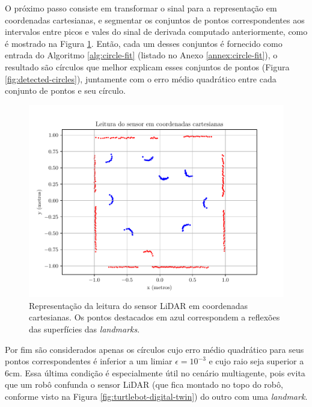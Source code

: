 O próximo passo consiste em transformar o sinal para a representação em 
coordenadas cartesianas, e segmentar os conjuntos de pontos correspondentes aos intervalos entre picos e vales do sinal de derivada computado anteriormente, como é mostrado na Figura \ref{fig:sensor-data-cartesian}.
Então, cada um desses conjuntos é fornecido como entrada do Algoritmo 
\ref{alg:circle-fit} (listado no Anexo \ref{annex:circle-fit}), o resultado 
são círculos que melhor explicam esses conjuntos de pontos (Figura \ref{fig:detected-circles}), juntamente com o 
erro médio quadrático entre cada conjunto de pontos e seu círculo.
\begin{figure}[]
  \centering
  \includegraphics[width=.8\textwidth]{figs/sensor_data_cartesian.pdf}
  \caption{Representação da leitura do sensor LiDAR em coordenadas 
  cartesianas. Os pontos destacados em azul correspondem a reflexões 
  das superfícies das \textit{landmarks}.}
  \label{fig:sensor-data-cartesian}
\end{figure}

Por fim são considerados apenas os círculos cujo erro médio quadrático para 
seus pontos correspondentes é inferior a um limiar $\epsilon = 10^{-3}$ e 
cujo raio seja superior a 6cm. Essa última condição é especialmente útil no 
cenário multiagente, pois evita que um robô confunda o sensor LiDAR (que 
fica montado no topo do robô, conforme visto na Figura \ref{fig:turtlebot-digital-twin}) do outro com uma \textit{landmark}.

